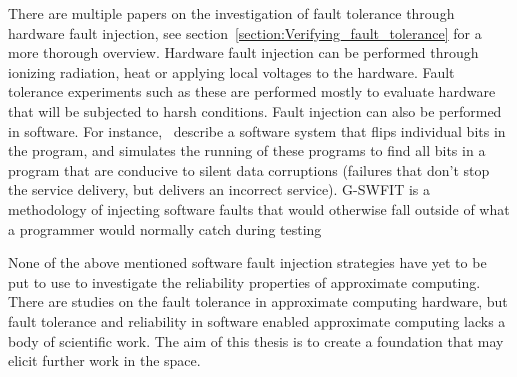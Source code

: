 There are multiple papers on the investigation of fault tolerance through hardware fault injection, see section~\ref{section:Verifying_fault_tolerance} for a more thorough overview. Hardware fault injection can be performed through ionizing radiation, heat or applying local voltages to the hardware. Fault tolerance experiments such as these are performed mostly to evaluate hardware that will be subjected to harsh conditions. 
Fault injection can also be performed in software. For instance,~\citet{venkatagiri2019gem5} describe a software system that flips individual bits in the program, and simulates the running of these programs to find all bits in a program that are conducive to silent data corruptions (failures that don't stop the service delivery, but delivers an incorrect service).  G-SWFIT is a methodology of injecting software faults that would otherwise fall outside of what a programmer would normally catch during testing~\citep{natella2012fault}


None of the above mentioned software fault injection strategies have yet to be put to use to investigate the reliability properties of approximate computing. There are studies on the fault tolerance in approximate computing hardware, but fault tolerance and reliability in software enabled approximate computing lacks a body of scientific work. The aim of this thesis is to create a foundation that may elicit further work in the space.
